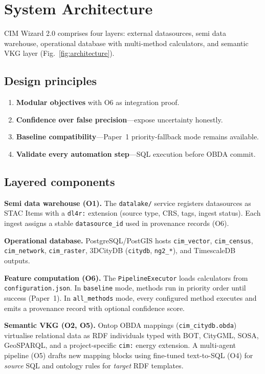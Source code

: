 \section{System Architecture}
\label{sec:architecture}

CIM Wizard 2.0 comprises four layers: external datasources, semi data warehouse, operational database with multi-method calculators, and semantic VKG layer (Fig.~\ref{fig:architecture}).

\subsection{Design principles}

\begin{enumerate}[label=\textbf{D\arabic*.}, leftmargin=*]
  \item \textbf{Modular objectives} with O6 as integration proof.
  \item \textbf{Confidence over false precision}---expose uncertainty honestly.
  \item \textbf{Baseline compatibility}---Paper~1 priority-fallback mode remains available.
  \item \textbf{Validate every automation step}---SQL execution before OBDA commit.
\end{enumerate}

\subsection{Layered components}

\textbf{Semi data warehouse (O1).}
The \texttt{datalake/} service registers datasources as STAC Items with a \texttt{dl4r:} extension (source type, CRS, tags, ingest status).
Each ingest assigns a stable \texttt{datasource\_id} used in provenance records (O6).

\textbf{Operational database.}
PostgreSQL/PostGIS hosts \texttt{cim\_vector}, \texttt{cim\_census}, \texttt{cim\_network}, \texttt{cim\_raster}, 3DCityDB (\texttt{citydb}, \texttt{ng2\_*}), and TimescaleDB outputs.

\textbf{Feature computation (O6).}
The \texttt{PipelineExecutor} loads calculators from \texttt{configuration.json}.
In \texttt{baseline} mode, methods run in priority order until success (Paper~1).
In \texttt{all\_methods} mode, every configured method executes and emits a provenance record with optional confidence score.

\textbf{Semantic VKG (O2, O5).}
Ontop OBDA mappings (\texttt{cim\_citydb.obda}) virtualise relational data as RDF individuals typed with BOT, CityGML, SOSA, GeoSPARQL, and a project-specific \texttt{cim:} energy extension.
A multi-agent pipeline (O5) drafts new mapping blocks using fine-tuned text-to-SQL (O4) for \emph{source} SQL and ontology rules for \emph{target} RDF templates.

